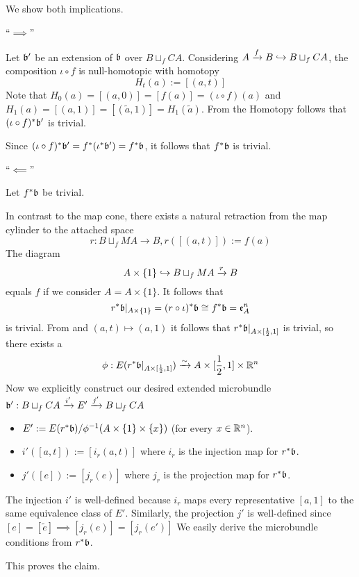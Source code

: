 \begin{myproof}
We show both implications.

``$\implies$''

Let $\bb'$ be an extension of $\bb$ over $B \sqcup_f CA$.
Considering $A \xto{f} B \incl B \sqcup_f CA$, the composition $\iota \circ f$ is null-homotopic with homotopy
\[ H_t(a) := [(a, t)] \]
Note that $H_0(a) = [(a, 0)] = [f(a)] = (\iota \circ f)(a)$ and $H_1(a) = [(a, 1)] = [(\tilde{a}, 1)] = H_1(\tilde{a})$.
From the Homotopy  follows that $(\iota \circ f)^*\bb'$ is trivial. 

Since $(\iota \circ f)^*\bb' = f^*(\iota^*\bb') = f^*\bb$, it follows that $f^*\bb$ is trivial.

``$\impliedby$''

Let $f^*\bb$ be trivial.

In contrast to the map cone, there exists a natural retraction from the map cylinder to the attached space
\[ r: B \sqcup_f MA \to B, r([(a, t)]) := f(a) \]
The diagram
\[ A \times \{1\} \incl B \sqcup_f MA \xto{r} B \]
equals $f$ if we consider $A = A \times \{1\}$.
It follows that
\[ r^*\bb\restr{A \times \{1\}} = (r \circ \iota)^*\bb \cong f^*\bb = \mathfrak{e}^n_A\]
is trivial.
From  and $(a, t) \mapsto (a, 1)$ it follows that $r^*\bb\restr{A \times [\frac{1}{2}, 1]}$ is trivial,
so there exists a
\[ \phi: E(r^*\bb\restr{A \times [\frac{1}{2}, 1]}) \isomto A \times [\frac{1}{2}, 1] \times \R^n \]
Now we explicitly construct our desired extended microbundle $\bundledef{\bb'}{B \sqcup_f CA}{E'}{i'}{j'}$
\begin{itemize}
    \item $E' := E(r^*\bb) / \phi^{-1}(A \times \{1\} \times \{x\})$ (for every $x \in \R^n$).
    \item $i'([a, t]) := [i_r(a, t)]$ where $i_r$ is the injection map for $r^*\bb$.
    \item $j'([e]) := [j_r(e)]$ where $j_r$ is the projection map for $r^*\bb$.
\end{itemize}
The injection $i'$ is well-defined because $i_r$ maps every representative $[a, 1]$ to the same equivalence class of $E'$.
Similarly, the projection $j'$ is well-defined since $[e] = [\tilde{e}] \implies [j_r(e)] = [j_r(e')]$
We easily derive the microbundle conditions from $r^*\bb$.

This proves the claim.
\end{myproof}